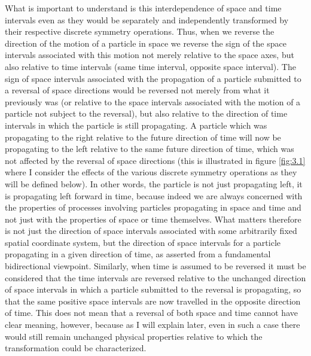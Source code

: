 \documentclass[notitlepage,12pt]{report}
\begin{document}
What is important to understand is this interdependence of space and time intervals even as they would be separately and independently transformed by their respective discrete symmetry operations. Thus, when we reverse the direction of the motion of a particle in space we reverse the sign of the space intervals associated with this motion not merely relative to the space axes, but also relative to time intervals (same time interval, opposite space interval). The sign of space intervals associated with the propagation of a particle submitted to a reversal of space directions would be reversed not merely from what it previously was (or relative to the space intervals associated with the motion of a particle not subject to the reversal), but also relative to the direction of time intervals in which the particle is still propagating. A particle which was propagating to the right relative to the future direction of time will now be propagating to the left relative to the same future direction of time, which was not affected by the reversal of space directions (this is illustrated in figure \ref{fig:3.1} where I consider the effects of the various discrete symmetry operations as they will be defined below). In other words, the particle is not just propagating left, it is propagating left forward in time, because indeed we are always concerned with the properties of processes involving particles propagating in space and time and not just with the properties of space or time themselves. What matters therefore is not just the direction of space intervals associated with some arbitrarily fixed spatial coordinate system, but the direction of space intervals for a particle propagating in a given direction of time, as asserted from a fundamental bidirectional viewpoint. Similarly, when time is assumed to be reversed it must be considered that the time intervals are reversed relative to the unchanged direction of space intervals in which a particle submitted to the reversal is propagating, so that the same positive space intervals are now travelled in the opposite direction of time. This does not mean that a reversal of both space and time cannot have clear meaning, however, because as I will explain later, even in such a case there would still remain unchanged physical properties relative to which the transformation could be characterized.
\end{document}
